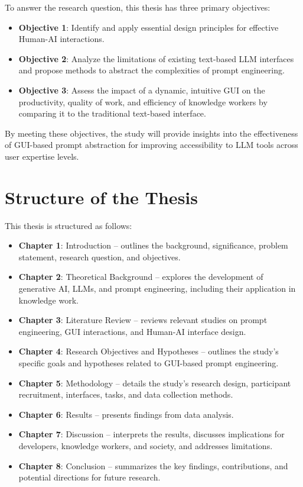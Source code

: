 To answer the research question, this thesis has three primary objectives:

\begin{itemize}
    \item \textbf{Objective 1}: Identify and apply essential design principles for effective Human-AI interactions.
    \item \textbf{Objective 2}: Analyze the limitations of existing text-based LLM interfaces and propose methods to abstract the complexities of prompt engineering.
    \item \textbf{Objective 3}: Assess the impact of a dynamic, intuitive GUI on the productivity, quality of work, and efficiency of knowledge workers by comparing it to the traditional text-based interface.
\end{itemize}

By meeting these objectives, the study will provide insights into the effectiveness of GUI-based prompt abstraction for improving accessibility to LLM tools across user expertise levels.

\section{Structure of the Thesis}
This thesis is structured as follows:

\begin{itemize}
    \item \textbf{Chapter 1}: Introduction – outlines the background, significance, problem statement, research question, and objectives.
    \item \textbf{Chapter 2}: Theoretical Background – explores the development of generative AI, LLMs, and prompt engineering, including their application in knowledge work.
    \item \textbf{Chapter 3}: Literature Review – reviews relevant studies on prompt engineering, GUI interactions, and Human-AI interface design.
    \item \textbf{Chapter 4}: Research Objectives and Hypotheses – outlines the study’s specific goals and hypotheses related to GUI-based prompt engineering.
    \item \textbf{Chapter 5}: Methodology – details the study’s research design, participant recruitment, interfaces, tasks, and data collection methods.
    \item \textbf{Chapter 6}: Results – presents findings from data analysis.
    \item \textbf{Chapter 7}: Discussion – interprets the results, discusses implications for developers, knowledge workers, and society, and addresses limitations.
    \item \textbf{Chapter 8}: Conclusion – summarizes the key findings, contributions, and potential directions for future research.
\end{itemize}